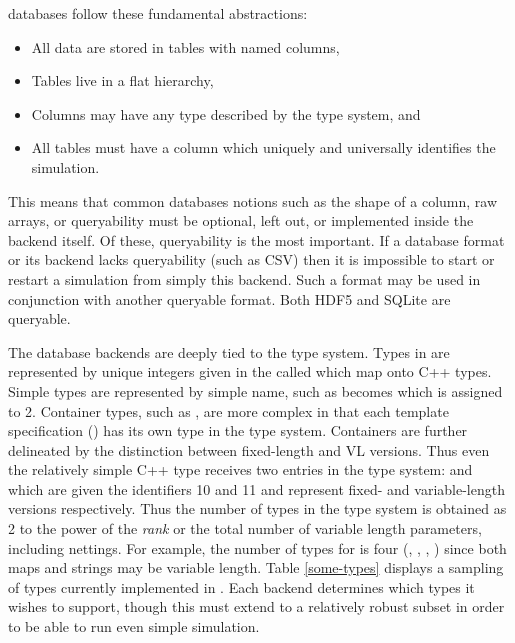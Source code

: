 \Cyclus databases follow these fundamental abstractions:
\begin{itemize}
    \item All data are stored in tables with named columns,
    \item Tables live in a flat hierarchy,
    \item Columns may have any type described by the \cyclus type system, and
    \item All tables must have a  column which uniquely and 
          universally identifies the simulation.
\end{itemize}
This means that common databases notions such as the shape of a column, raw arrays, or
queryability must be optional, left out, or implemented inside the backend itself.
Of these, queryability is the most important. If a database format or its backend lacks 
queryability (such as \gls{CSV}) then it is impossible to start or restart a 
\cyclus simulation from simply this backend.  Such a format may be used in 
conjunction with another queryable format. Both \gls{HDF5} and \gls{SQLite} are queryable.

The database backends are deeply tied to the \cyclus type system. Types in \cyclus
are represented by unique integers given in the  called 
which map onto C++ types.
Simple types are represented by simple name, such as  becomes
 which is assigned to 2. Container types, such as ,
are more complex in that each template specification () has
its own type in the \cyclus type system.  Containers are further delineated by 
the distinction between fixed-length and \gls{VL} versions. Thus even the 
relatively simple C++ type  receives two entries in the 
\cyclus type system:  and  which are given 
the identifiers 10 and 11 and represent fixed- and variable-length versions 
respectively.  Thus the number of types in the \cyclus type system is obtained as 
2 to the power of the \emph{rank} or the total number of variable length parameters, 
including nettings.
For example, the number of \cyclus types for  is 
four (, , , 
) since both maps and strings may be variable length.
Table \ref{some-types} displays a sampling of types currently implemented in 
\cyclus.
Each backend determines which types it wishes to support, though this must extend 
to a relatively robust subset in order to be able to run even simple simulation.

